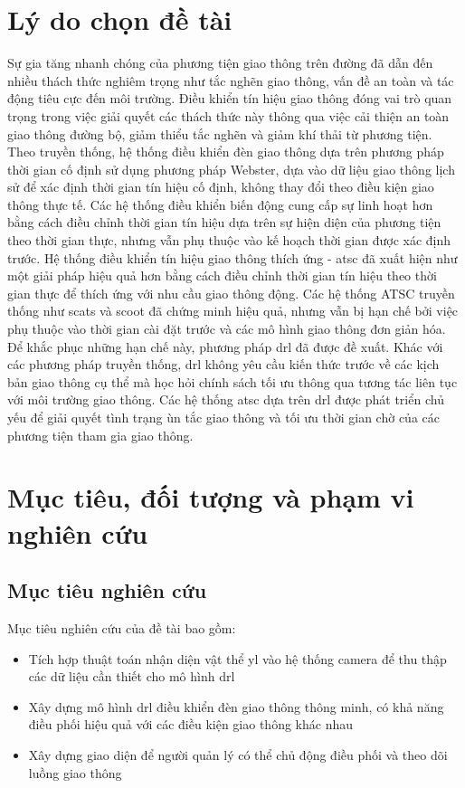 \section{Lý do chọn đề tài}

Sự gia tăng nhanh chóng của phương tiện giao thông trên đường đã dẫn đến nhiều thách
thức nghiêm trọng như tắc nghẽn giao thông, vấn đề an toàn và tác động tiêu cực
đến môi trường. Điều khiển tín hiệu giao thông đóng vai trò quan trọng trong việc
giải quyết các thách thức này thông qua việc cải thiện an toàn giao thông đường bộ,
giảm thiểu tắc nghẽn và giảm khí thải từ phương tiện. Theo truyền thống, hệ
thống điều khiển đèn giao thông dựa trên phương pháp thời gian cố định sử dụng
phương pháp Webster, dựa vào dữ liệu giao thông lịch sử để xác định thời gian tín
hiệu cố định, không thay đổi theo điều kiện giao thông thực tế. Các hệ thống điều
khiển biến động cung cấp sự linh hoạt hơn bằng cách điều chỉnh thời gian tín hiệu
dựa trên sự hiện diện của phương tiện theo thời gian thực, nhưng vẫn phụ thuộc
vào kế hoạch thời gian được xác định trước. Hệ thống điều khiển tín hiệu giao thông
thích ứng - \ac{atsc} đã xuất hiện như một giải pháp hiệu quả hơn bằng cách điều
chỉnh thời gian tín hiệu theo thời gian thực để thích ứng với nhu cầu giao thông
động. Các hệ thống ATSC truyền thống như \ac{scats} và \ac{scoot} đã chứng minh hiệu
quả, nhưng vẫn bị hạn chế bởi việc phụ thuộc vào thời gian cài đặt trước và các
mô hình giao thông đơn giản hóa. Để khắc phục những hạn chế này, phương pháp \ac{drl}
đã được đề xuất. Khác với các phương pháp truyền thống, \ac{drl} không yêu cầu
kiến thức trước về các kịch bản giao thông cụ thể mà học hỏi chính sách tối ưu
thông qua tương tác liên tục với môi trường giao thông. Các hệ thống \ac{atsc}
dựa trên \ac{drl} được phát triển chủ yếu để giải quyết tình trạng ùn tắc giao thông
và tối ưu thời gian chờ của các phương tiện tham gia giao thông.
\section{Mục tiêu, đối tượng và phạm vi nghiên cứu}
\subsection{Mục tiêu nghiên cứu}
Mục tiêu nghiên cứu của đề tài bao gồm:
\begin{itemize}
    \item Tích hợp thuật toán nhận diện vật thể \ac{yl} vào hệ thống camera để
        thu thập các dữ liệu cần thiết cho mô hình \ac{drl}

    \item Xây dựng mô hình \ac{drl} điều khiển đèn giao thông thông minh, có khả
        năng điều phối hiệu quả với các điều kiện giao thông khác nhau

    \item Xây dựng giao diện để người quản lý có thể chủ động điều phối và theo dõi
        luồng giao thông
\end{itemize}

